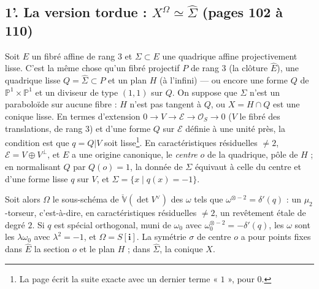 \documentclass[11pt,a4paper]{article}
\begin{document}
\subsection*{1'. La version tordue : $X^{\Omega} \simeq \hat{\Sigma}$ (pages 102 à 110)}

Soit $E$ un fibré affine de rang $3$ et $\Sigma \subset E$ une quadrique affine
projectivement lisse. C'est la même chose qu'un fibré projectif $P$ de rang $3$ (la
clôture $\hat{E}$), une quadrique lisse $Q = \hat{\Sigma} \subset P$ et un plan $H$
(à l'infini) — ou encore une forme $Q$ de $\mathbb{P}^1 \times \mathbb{P}^1$ et un diviseur
de type $(1, 1)$ sur $Q$. On suppose que $\Sigma$ n'est un paraboloïde sur aucune
fibre : $H$ n'est pas tangent à $Q$, ou $X = H \cap Q$ est une conique lisse. En
termes d'extension $0 \to V \to \mathcal{E} \to \mathcal{O}_S \to 0$ ($V$ le fibré des
translations, de rang $3$) et d'une forme $Q$ sur $\mathcal{E}$ définie à une unité près,
la condition est que $q = Q|V$ soit lisse\footnote{La page écrit la suite exacte avec
un dernier terme « $1$ », pour $0$.}. En caractéristiques résiduelles $\neq 2$,
$\mathcal{E} = V \oplus V^{\perp}$, et $E$ a une origine canonique, le \emph{centre} $o$
de la quadrique, pôle de $H$ ; en normalisant $Q$ par $Q(o) = 1$, la donnée de
$\Sigma$ équivaut à celle du centre et d'une forme lisse $q$ sur $V$, et $\Sigma =
\{x \mid q(x) = -1\}$.

Soit alors $\Omega$ le sous-schéma de $\check{\mathbb{V}}(\det V^{\vee})$ des $\omega$
tels que $\omega^{\otimes -2} = \delta'(q)$ : un $\mu_2$-torseur, c'est-à-dire, en
caractéristiques résiduelles $\neq 2$, un revêtement étale de degré $2$. Si $q$ est
spécial orthogonal, muni de $\omega_0$ avec $\omega_0^{\otimes -2} = -\delta'(q)$, les
$\omega$ sont les $\lambda\omega_0$ avec $\lambda^2 = -1$, et $\Omega =
S[\mathbf{i}]$. La symétrie $\sigma$ de centre $o$ a pour points fixes dans $\hat{E}$
la section $o$ et le plan $H$ ; dans $\hat{\Sigma}$, la conique $X$.
\end{document}
